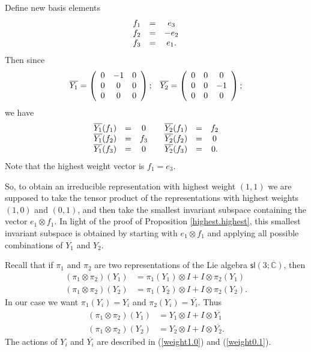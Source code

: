 \documentclass{amsbook}
\theoremstyle{plain}
\numberwithin{equation}{chapter}
\numberwithin{theorem}{chapter}
\begin{document}
Define new basis elements
\[%
\begin{array}
[c]{ccc}%
f_{1} & = & e_{3}\\
f_{2} & = & -e_{2}\\
f_{3} & = & e_{1}\text{.}%
\end{array}
\]
Then since
\[%
\begin{array}
[c]{cc}%
\overline{Y_{1}}=\left(
\begin{array}
[c]{ccc}%
0 & -1 & 0\\
0 & 0 & 0\\
0 & 0 & 0
\end{array}
\right)  ; & \overline{Y_{2}}=\left(
\begin{array}
[c]{ccc}%
0 & 0 & 0\\
0 & 0 & -1\\
0 & 0 & 0
\end{array}
\right)  ;
\end{array}
\]
we have
\begin{equation}%
\begin{array}
[c]{ccccccc}%
\overline{Y_{1}}(f_{1}) & = & 0 &  & \overline{Y_{2}}(f_{1}) & = & f_{2}\\
\overline{Y_{1}}(f_{2}) & = & f_{3} &  & \overline{Y_{2}}(f_{2}) & = & 0\\
\overline{Y_{1}}(f_{3}) & = & 0 &  & \overline{Y_{2}}(f_{3}) & = & 0\text{.}%
\end{array}
\label{weight0.1}%
\end{equation}
Note that the highest weight vector is $f_{1}=e_{3}$.

So, to obtain an irreducible representation with highest weight $\left(
1,1\right)  $ we are supposed to take the tensor product of the
representations with highest weights $\left(  1,0\right)  $ and $\left(
0,1\right)  $, and then take the smallest invariant subspace containing the
vector $e_{1}\otimes f_{1}$. In light of the proof of Proposition
\ref{highest.highest}, this smallest invariant subspace is obtained by
starting with $e_{1}\otimes f_{1}$ and applying all possible combinations of
$Y_{1}$ and $Y_{2}$.

Recall that if $\pi_{1}$ and $\pi_{2}$ are two representations of the Lie
algebra $\mathsf{sl}\left(  3;\mathbb{C}\right)  $, then
\begin{align*}
\left(  \pi_{1}\otimes\pi_{2}\right)  (Y_{1})  & =\pi_{1}(Y_{1})\otimes
I+I\otimes\pi_{2}(Y_{1})\\
\left(  \pi_{1}\otimes\pi_{2}\right)  (Y_{2})  & =\pi_{1}(Y_{2})\otimes
I+I\otimes\pi_{2}(Y_{2})\text{.}%
\end{align*}
In our case we want $\pi_{1}(Y_{i})=Y_{i}$ and $\pi_{2}(Y_{i})=\overline
{Y_{i}}$. Thus
\begin{align*}
\left(  \pi_{1}\otimes\pi_{2}\right)  (Y_{1})  & =Y_{1}\otimes I+I\otimes
\overline{Y_{1}}\\
\left(  \pi_{1}\otimes\pi_{2}\right)  (Y_{2})  & =Y_{2}\otimes I+I\otimes
\overline{Y_{2}}\text{.}%
\end{align*}
The actions of $Y_{i}$ and $\overline{Y_{i}}$ are described in
(\ref{weight1.0}) and (\ref{weight0.1}).
\end{document}

